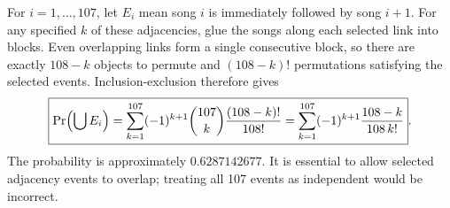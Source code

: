 For $i=1,\ldots,107$, let $E_i$ mean song $i$ is immediately followed by song $i+1$. For any specified $k$ of these adjacencies, glue the songs along each selected link into blocks. Even overlapping links form a single consecutive block, so there are exactly $108-k$ objects to permute and $(108-k)!$ permutations satisfying the selected events. Inclusion-exclusion therefore gives\[\boxed{\Pr\Bigl(\bigcup E_i\Bigr)=\sum_{k=1}^{107}(-1)^{k+1}\binom{107}{k}\dfrac{(108-k)!}{108!}=\sum_{k=1}^{107}(-1)^{k+1}\dfrac{108-k}{108\,k!}}.\]The probability is approximately $0.6287142677$. It is essential to allow selected adjacency events to overlap; treating all 107 events as independent would be incorrect.
